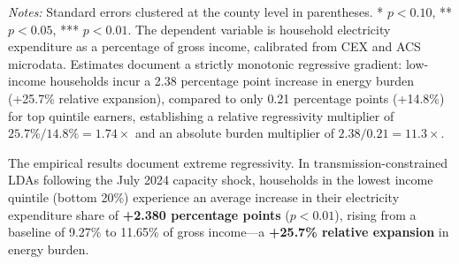 \documentclass[11pt,a4paper]{article}
\begin{document}
\begin{table}[htbp]
\centering
\small
\caption{Distributional Incidence of the AI Grid Shock Across Household Income Quintiles}
\label{tab:table5_distribution}
\begin{minipage}{\linewidth}
\vspace{1ex}
\footnotesize \textit{Notes:} Standard errors clustered at the county level in parentheses. * $p<0.10$, ** $p<0.05$, *** $p<0.01$. The dependent variable is household electricity expenditure as a percentage of gross income, calibrated from CEX and ACS microdata. Estimates document a strictly monotonic regressive gradient: low-income households incur a 2.38 percentage point increase in energy burden (+25.7\% relative expansion), compared to only 0.21 percentage points (+14.8\%) for top quintile earners, establishing a relative regressivity multiplier of $25.7\% / 14.8\% = 1.74\times$ and an absolute burden multiplier of $2.38 / 0.21 = 11.3\times$.
\end{minipage}
\end{table}


The empirical results document extreme regressivity. In transmission-constrained LDAs following the July 2024 capacity shock, households in the lowest income quintile (bottom 20\%) experience an average increase in their electricity expenditure share of \textbf{+2.380 percentage points} ($p < 0.01$), rising from a baseline of 9.27\% to 11.65\% of gross income---a \textbf{+25.7\% relative expansion} in energy burden.
\end{document}
